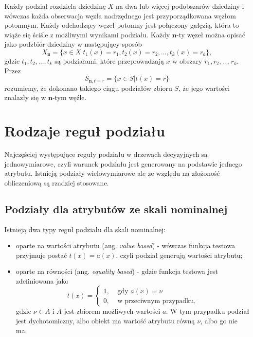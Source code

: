 \documentclass[
]{book}
\providecommand{\tightlist}{%
  \setlength{\itemsep}{0pt}\setlength{\parskip}{0pt}}
\theoremstyle{plain}
\theoremstyle{definition}
\theoremstyle{definition}
\theoremstyle{definition}
\theoremstyle{definition}
\theoremstyle{remark}
\begin{document}
Każdy podział rozdziela dziedzinę \(X\) na dwa lub więcej podobszarów dziedziny i wówczas każda obserwacja węzła nadrzędnego jest przyporządkowana węzłom potomnym. Każdy odchodzący węzeł potomny jest połączony gałęzią, która to wiąże się ściśle z możliwymi wynikami podziału. Każdy \(\mathbf{n}\)-ty węzeł można opisać jako podzbiór dziedziny w następujący sposób
\begin{equation}
    X_{\mathbf{n}}=\{x\in X|t_1(x)=r_1,t_2(x)=r_2,\ldots,t_k(x)=r_k\},
\end{equation}
gdzie \(t_1,t_2,\ldots,t_k\) są podziałami, które przeprowadzają \(x\) w obszary \(r_1, r_2,\ldots, r_k\). Przez
\begin{equation}
    S_{\mathbf{n}, t=r}=\{x\in S|t(x)=r\}
\end{equation}
rozumiemy, że dokonano takiego ciągu podziałów zbioru \(S\), że jego wartości znalazły się w \(\mathbf{n}\)-tym węźle.

\hypertarget{rodzaje-reguux142-podziaux142u}{%
\section{Rodzaje reguł podziału}\label{rodzaje-reguux142-podziaux142u}}

Najczęściej występujące reguły podziału w drzewach decyzyjnych są jednowymiarowe, czyli warunek podziału jest generowany na podstawie jednego atrybutu. Istnieją podziały wielowymiarowe ale ze względu na złożoność obliczeniową są rzadziej stosowane.

\hypertarget{podziaux142y-dla-atrybutuxf3w-ze-skali-nominalnej}{%
\subsection{Podziały dla atrybutów ze skali nominalnej}\label{podziaux142y-dla-atrybutuxf3w-ze-skali-nominalnej}}

Istnieją dwa typy reguł podziału dla skali nominalnej:

\begin{itemize}
\tightlist
\item
  oparte na wartości atrybutu (ang. \emph{value based}) - wówczas funkcja testowa przyjmuje postać \(t(x)=a(x)\), czyli podział generują wartości atrybutu;
\item
  oparte na równości (ang. \emph{equality based}) - gdzie funkcja testowa jest zdefiniowana jako
  \begin{equation}
    t(x)= \begin{cases}
        1, &\text{ gdy } a(x)=\nu\\
        0, & \text{ w przeciwnym przypadku},
    \end{cases}
  \end{equation}
  gdzie \(\nu\in A\) i \(A\) jest zbiorem możliwych wartości \(a\). W tym przypadku podział jest dychotomiczny, albo obiekt ma wartość atrybutu równą \(\nu\), albo go nie ma.
\end{itemize}
\end{document}
